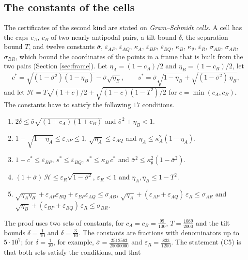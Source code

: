 \documentclass[reqno,a4paper,11pt]{amsart}
\numberwithin{equation}{section}
\begin{document}
\subsection{The constants of the cells}\label{sec:s3n9cells}

The certificates of the second kind are stated on \emph{Gram--Schmidt cells}. A cell has the caps $c_A$, $c_B$ of two nearly antipodal pairs, a tilt bound $\delta$, the separation bound $T$, and twelve constants $\bar\sigma$, $\varepsilon_{AP}$, $\varepsilon_{AQ}$, $\kappa_A$, $\varepsilon_{BP}$, $\varepsilon_{BQ}$, $\kappa_B$, $\kappa_\theta$, $\varepsilon_R$, $\sigma_{AB}$, $\sigma_{AR}$, $\sigma_{BR}$, which bound the coordinates of the points in a frame that is built from the two pairs (Section \ref{sec:frame}). Let $\eta_A = (1 - c_A)/2$ and $\eta_B = (1 - c_B)/2$, let
$$
c^* = \sqrt{(1 - \bar\sigma^2)(1 - \eta_B)} - \bar\sigma \sqrt{\eta_B}, \qquad s^* = \bar\sigma \sqrt{1 - \eta_B} + \sqrt{(1 - \bar\sigma^2) \, \eta_B},
$$
and let $\mathcal{H} = T \sqrt{(1 + c)/2} + \sqrt{(1 - c)(1 - T^2)/2}$ for $c = \min (c_A, c_B)$. The constants have to satisfy the following $17$ conditions.
\begin{enumerate}
    \item[(V1)] $2 \delta \leq \bar\sigma \sqrt{(1 + c_A)(1 + c_B)}$ and $\bar\sigma^2 + \eta_B < 1$.
    \item[(V2)] $1 - \sqrt{1 - \eta_A} \leq \varepsilon_{AP} \leq 1$, $\sqrt{\eta_A} \leq \varepsilon_{AQ}$ and $\eta_A \leq \kappa_A^2 (1 - \eta_A)$.
    \item[(V3)] $1 - c^* \leq \varepsilon_{BP}$, $s^* \leq \varepsilon_{BQ}$, $s^* \leq \kappa_B \, c^*$ and $\bar\sigma^2 \leq \kappa_\theta^2 (1 - \bar\sigma^2)$.
    \item[(V4)] $(1 + \bar\sigma) \, \mathcal{H} \leq \varepsilon_R \sqrt{1 - \bar\sigma^2}$, $\varepsilon_R < 1$ and $\eta_A, \eta_B \leq 1 - T^2$.
    \item[(V5)] $\sqrt{\eta_A \eta_B} + \varepsilon_{AP} \varepsilon_{BQ} + \varepsilon_{BP} \varepsilon_{AQ} \leq \sigma_{AB}$, $\sqrt{\eta_A} + (\varepsilon_{AP} + \varepsilon_{AQ}) \, \varepsilon_R \leq \sigma_{AR}$ and $\sqrt{\eta_B} + (\varepsilon_{BP} + \varepsilon_{BQ}) \, \varepsilon_R \leq \sigma_{BR}$.
\end{enumerate}
The proof uses two sets of constants, for $c_A = c_B = \tfrac{99}{100}$, $T = \tfrac{1089}{2000}$ and the tilt bounds $\delta = \tfrac{1}{10}$ and $\delta = \tfrac{3}{10}$. The constants are fractions with denominators up to $5 \cdot 10^7$; for $\delta = \tfrac{1}{10}$, for example, $\bar\sigma = \tfrac{2512563}{25000000}$ and $\varepsilon_R = \tfrac{833}{1250}$. The statement (C5) is that both sets satisfy the conditions, and that
\end{document}
